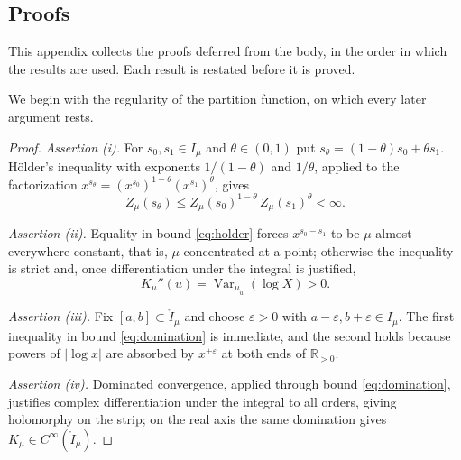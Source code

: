 \documentclass[sn-mathphys-num]{sn-jnl}
\theoremstyle{thmstyleone}%
\theoremstyle{thmstyletwo}%
\theoremstyle{thmstylethree}%
\theoremstyle{thmstyleone}%
\providecommand{\Var}{\operatorname{Var}}
\providecommand{\Rpos}{\mathbb{R}_{>0}}
\begin{document}
	\begin{appendices}
		
		\section{Proofs}\label{app:proofs}
		
		
		This appendix collects the proofs deferred from the body, in the
		order in which the results are used. Each result is restated
		before it is proved.
		
		We begin with the regularity of the partition function, on which
		every later argument rests.
		
		\lemlogconvex*
		
		\begin{proof}
			\emph{Assertion (i).} For $s_0,s_1\in I_\mu$ and
			$\theta\in(0,1)$ put $s_\theta=(1-\theta)s_0+\theta s_1$.
			H\"older's inequality with exponents $1/(1-\theta)$ and
			$1/\theta$, applied to the factorization
			$x^{s_\theta}=(x^{s_0})^{1-\theta}(x^{s_1})^{\theta}$, gives
			\begin{equation}\label{eq:holder}
				Z_\mu(s_\theta)\le
				Z_\mu(s_0)^{1-\theta}\,Z_\mu(s_1)^{\theta}<\infty .
			\end{equation}
			
			\emph{Assertion (ii).} Equality in bound \eqref{eq:holder}
			forces $x^{s_0-s_1}$ to be $\mu$-almost everywhere constant,
			that is, $\mu$ concentrated at a point; otherwise the
			inequality is strict and, once differentiation under the
			integral is justified,
			\begin{equation}\label{eq:Kpp}
				K_\mu''(u)=\Var_{\mu_u}(\log X)>0 .
			\end{equation}
			
			\emph{Assertion (iii).} Fix $[a,b]\subset\mathring I_\mu$ and
			choose $\varepsilon>0$ with
			$a-\varepsilon,b+\varepsilon\in I_\mu$. The first inequality in
			bound \eqref{eq:domination} is immediate, and the second holds
			because powers of $|\log x|$ are absorbed by
			$x^{\pm\varepsilon}$ at both ends of $\Rpos$.
			
			\emph{Assertion (iv).} Dominated convergence, applied through
			bound \eqref{eq:domination}, justifies complex differentiation
			under the integral to all orders, giving holomorphy on the
			strip; on the real axis the same domination gives
			$K_\mu\in C^\infty(\mathring I_\mu)$.
			

\end{proof}
\end{appendices}
\end{document}
